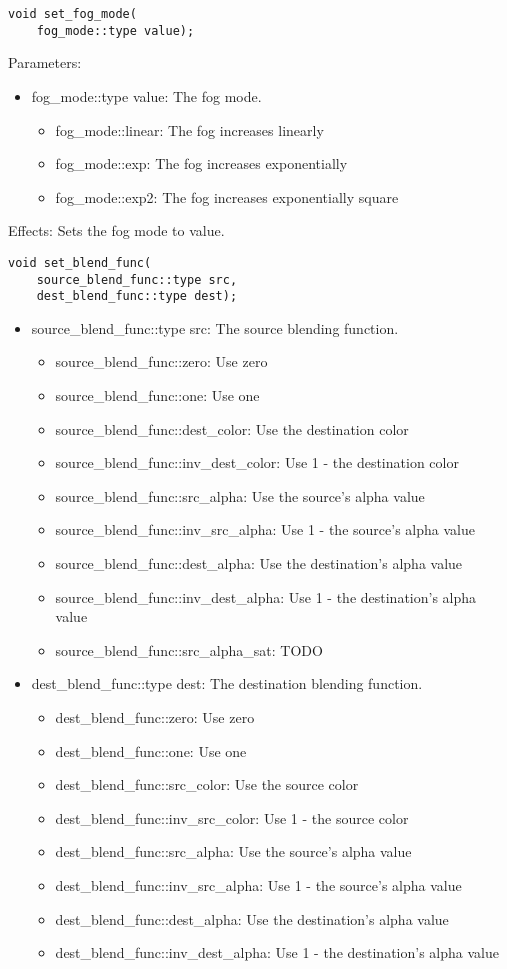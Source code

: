 \documentclass{article}
\begin{document}
\begin{lstlisting}
void set_fog_mode(
	fog_mode::type value);
\end{lstlisting}
Parameters:
\begin{itemize}
\item fog\_mode::type value: The fog mode.
  \begin{itemize}
  \item fog\_mode::linear: The fog increases linearly
  \item fog\_mode::exp: The fog increases exponentially
  \item fog\_mode::exp2: The fog increases exponentially square
  \end{itemize}
\end{itemize}
Effects: Sets the fog mode to value.

\begin{lstlisting}
void set_blend_func(
	source_blend_func::type src,
	dest_blend_func::type dest);
\end{lstlisting}
\begin{itemize}
\item source\_blend\_func::type src: The source blending function.
  \begin{itemize}
  \item source\_blend\_func::zero: Use zero
  \item source\_blend\_func::one: Use one
  \item source\_blend\_func::dest\_color: Use the destination color
  \item source\_blend\_func::inv\_dest\_color: Use 1 - the destination color
  \item source\_blend\_func::src\_alpha: Use the source's alpha value
  \item source\_blend\_func::inv\_src\_alpha: Use 1 - the source's alpha value
  \item source\_blend\_func::dest\_alpha: Use the destination's alpha value
  \item source\_blend\_func::inv\_dest\_alpha: Use 1 - the destination's alpha value
  \item source\_blend\_func::src\_alpha\_sat: TODO
  \end{itemize}
\item dest\_blend\_func::type dest: The destination blending function.
  \begin{itemize}
  \item dest\_blend\_func::zero: Use zero
  \item dest\_blend\_func::one: Use one
  \item dest\_blend\_func::src\_color: Use the source color
  \item dest\_blend\_func::inv\_src\_color: Use 1 - the source color
  \item dest\_blend\_func::src\_alpha: Use the source's alpha value
  \item dest\_blend\_func::inv\_src\_alpha: Use 1 - the source's alpha value
  \item dest\_blend\_func::dest\_alpha: Use the destination's alpha value
  \item dest\_blend\_func::inv\_dest\_alpha: Use 1 - the destination's alpha value
  \end{itemize}
\end{itemize}
\end{document}
